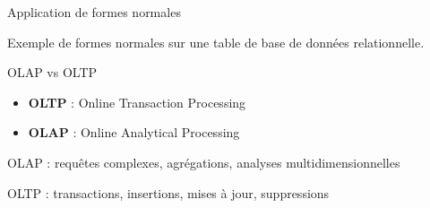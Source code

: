 \begin{frame}{Application de formes normales}

    Exemple de formes normales sur une table de base de données relationnelle.

\end{frame}

\begin{frame}{OLAP vs OLTP}

    \begin{itemize}
        \item \textbf{OLTP} : Online Transaction Processing
        \item \textbf{OLAP} : Online Analytical Processing
    \end{itemize}

    OLAP : requêtes complexes, agrégations, analyses multidimensionnelles

    OLTP : transactions, insertions, mises à jour, suppressions

\end{frame}
